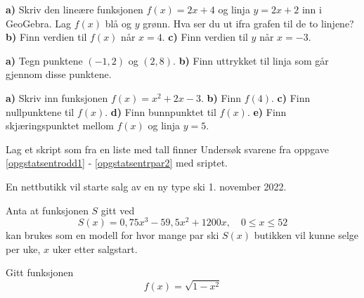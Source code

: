 





\nes

\textbf{a)} Skriv den lineære funksjonen $ {f(x)=2x+4} $ og linja $ {y=2x+2} $ inn i GeoGebra. Lag $ f(x) $ blå og $ y $ grønn. Hva ser du ut ifra grafen til de to linjene?\bs
\textbf{b)} Finn verdien til $ f(x) $ når $ {x=4} $.\bs
\textbf{c)} Finn verdien til $ y $ når $ {x=-3} $.\vsk

\textbf{a)} Tegn punktene $ (-1,2) $ og $ (2,8) $.\bs
\textbf{b)} Finn uttrykket til linja som går gjennom disse punktene.\vsk

\textbf{a)} Skriv inn funksjonen $ {f(x)=x^2+2x-3} $.\bs
\textbf{b)} Finn $ f(4) $.\bs
\textbf{c)} Finn nullpunktene til $ f(x) $.\bs
\textbf{d)} Finn bunnpunktet til $ f(x) $.\bs
\textbf{e)} Finn skjæringspunktet mellom $ f(x) $ og linja $ y=5 $.



Lag et skript som fra en liste med tall finner
Undersøk svarene fra {\color{blue}oppgave \ref{opgstatsentrodd1} - \ref{opgstatsentrpar2}} med sriptet.

En nettbutikk vil starte salg av en ny type ski 1. november 2022.

Anta at funksjonen $S$ gitt ved
\[
S(x) = 0{,}75x^3 - 59{,}5x^2 + 1200x, \quad 0 \leq x \leq 52
\]
kan brukes som en modell for hvor mange par ski $S(x)$ butikken vil
kunne selge per uke, $x$ uker etter salgstart.



Gitt funksjonen
\[ f(x)=\sqrt{1-x^2} \]


